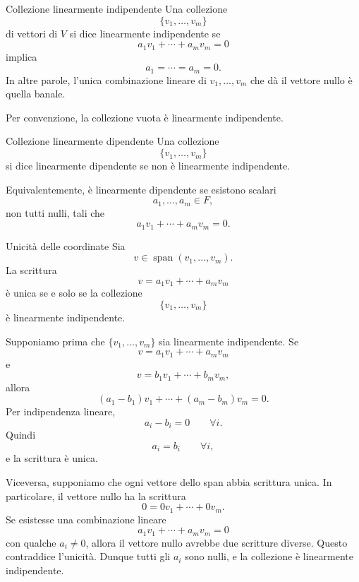 \documentclass[a4paper]{article}
\begin{document}
\begin{snippetdefinition}{Collezione linearmente indipendente}
    Una collezione
    \[
        \{v_1,\ldots,v_m\}
    \]
    di vettori di \(V\) si dice linearmente indipendente se
    \[
        a_1v_1+\cdots+a_mv_m=0
    \]
    implica
    \[
        a_1=\cdots=a_m=0.
    \]
    In altre parole, l'unica combinazione lineare di \(v_1,\ldots,v_m\) che dà il vettore nullo è quella banale.
\end{snippetdefinition}

Per convenzione, la collezione vuota è linearmente indipendente.

\begin{snippetdefinition}{Collezione linearmente dipendente}
    Una collezione
    \[
        \{v_1,\ldots,v_m\}
    \]
    si dice linearmente dipendente se non è linearmente indipendente.

    Equivalentemente, è linearmente dipendente se esistono scalari
    \[
        a_1,\ldots,a_m\in F,
    \]
    non tutti nulli, tali che
    \[
        a_1v_1+\cdots+a_mv_m=0.
    \]
\end{snippetdefinition}

\begin{snippetproposition}{Unicità delle coordinate}
    Sia
    \[
        v\in\operatorname{span}(v_1,\ldots,v_m).
    \]
    La scrittura
    \[
        v=a_1v_1+\cdots+a_mv_m
    \]
    è unica se e solo se la collezione
    \[
        \{v_1,\ldots,v_m\}
    \]
    è linearmente indipendente.
\end{snippetproposition}

\begin{snippetproof}{}
    Supponiamo prima che \(\{v_1,\ldots,v_m\}\) sia linearmente indipendente. Se
    \[
        v=a_1v_1+\cdots+a_mv_m
    \]
    e
    \[
        v=b_1v_1+\cdots+b_mv_m,
    \]
    allora
    \[
        (a_1-b_1)v_1+\cdots+(a_m-b_m)v_m=0.
    \]
    Per indipendenza lineare,
    \[
        a_i-b_i=0
        \qquad
        \forall i.
    \]
    Quindi
    \[
        a_i=b_i
        \qquad
        \forall i,
    \]
    e la scrittura è unica.

    Viceversa, supponiamo che ogni vettore dello span abbia scrittura unica. In particolare, il vettore nullo ha la scrittura
    \[
        0=0v_1+\cdots+0v_m.
    \]
    Se esistesse una combinazione lineare
    \[
        a_1v_1+\cdots+a_mv_m=0
    \]
    con qualche \(a_i\neq 0\), allora il vettore nullo avrebbe due scritture diverse. Questo contraddice l'unicità. Dunque tutti gli \(a_i\) sono nulli, e la collezione è linearmente indipendente.
\end{snippetproof}
\end{document}
